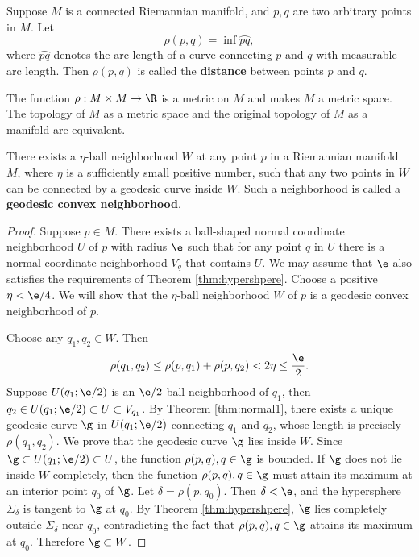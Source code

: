 \documentclass[11pt]{article}
\begin{document}
\begin{definition}
    Suppose $M$ is a connected Riemannian manifold, and $p, q$ are two arbitrary points in $M$. Let $$\rho(p, q) = \inf\wideparen{pq},$$ where $\wideparen{pq}$ denotes the arc length of a curve connecting $p$ and $q$ with measurable arc length. Then $\rho(p, q)$ is called the \textbf{distance} between points $p$ and $q$. 
\end{definition}

\begin{theorem}
    The function $\rho : M \times M \rightarrow \R$ is a metric on $M$ and makes $M$ a metric space. The topology of $M$ as a metric space and the original topology of $M$ as a manifold are equivalent. 
\end{theorem}

\begin{theorem}
    There exists a $\eta$-ball neighborhood $W$ at any point $p$ in a Riemannian manifold $M$, where $\eta$ is a sufficiently small positive number, such that any two points in $W$ can be connected by a geodesic curve inside $W$. Such a neighborhood is called a \textbf{geodesic convex neighborhood}.
\end{theorem}
\begin{proof}
    Suppose $p \in M$. There exists a ball-shaped normal coordinate neighborhood $U$ of $p$ with radius $\e$ such that for any point $q$ in $U$ there is a normal coordinate neighborhood $V_q$ that contains $U$. We may assume that $\e$ also satisfies the requirements of Theorem \ref{thm:hypershpere}. Choose a positive $\eta < \e/4$. We will show that the $\eta$-ball neighborhood $W$ of $p$ is a geodesic convex neighborhood of $p$. 

    Choose any $q_1, q_2 \in W$. Then $$\rho(q_1, q_2) \le \rho(p, q_1) + \rho(p, q_2) < 2\eta \le \frac{\e}{2}.$$ Suppose $U(q_1;\e/2)$ is an $\e/2$-ball neighborhood of $q_1$, then $q_2 \in U(q_1;\e/2) \subset U \subset V_{q_1}$. By Theorem \ref{thm:normal1}, there exists a unique geodesic curve $\g$ in $U(q_1;\e/2)$ connecting $q_1$ and $q_2$, whose length is precisely $\rho(q_1, q_2)$. We prove that the geodesic curve $\g$ lies inside $W$. Since $\g \subset U(q_1;\e/2) \subset U$, the function $\rho(p, q), q \in \g$ is bounded. If $\g$ does not lie inside $W$ completely, then the function $\rho(p, q), q \in \g$ must attain its maximum at an interior point $q_0$ of $\g$. Let $\delta = \rho(p, q_0).$ Then $\delta < \e$, and the hypersphere $\Sigma_\delta$ is tangent to $\g$ at $q_0$. By Theorem \ref{thm:hypershpere}, $\g$ lies completely outside $\Sigma_\delta$ near $q_0$, contradicting the fact that $\rho(p, q), q \in \g$ attains its maximum at $q_0$. Therefore $\g \subset W$. 
\end{proof}
\end{document}
